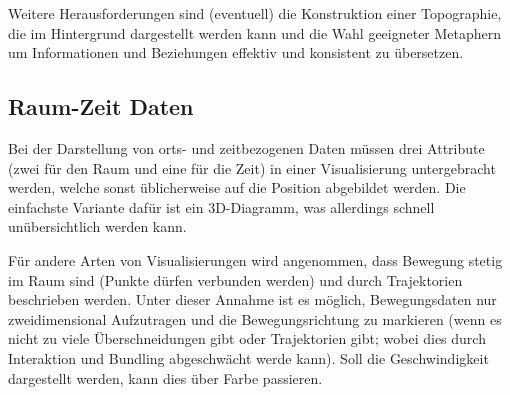 			Weitere Herausforderungen sind (eventuell) die Konstruktion einer Topographie, die im Hintergrund dargestellt werden kann und die Wahl geeigneter Metaphern um Informationen und Beziehungen effektiv und konsistent zu übersetzen.

		\subsection{Raum-Zeit Daten}
			Bei der Darstellung von orts- und zeitbezogenen Daten müssen drei Attribute (zwei für den Raum und eine für die Zeit) in einer Visualisierung untergebracht werden, welche sonst üblicherweise auf die Position abgebildet werden. Die einfachste Variante dafür ist ein 3D-Diagramm, was allerdings schnell unübersichtlich werden kann.

			Für andere Arten von Visualisierungen wird angenommen, dass Bewegung stetig im Raum sind (\dh Punkte dürfen verbunden werden) und durch Trajektorien beschrieben werden. Unter dieser Annahme ist es möglich, Bewegungsdaten nur zweidimensional Aufzutragen und die Bewegungsrichtung zu markieren (wenn es nicht zu viele Überschneidungen gibt oder Trajektorien gibt; wobei dies durch Interaktion und Bundling abgeschwächt werde kann). Soll die Geschwindigkeit dargestellt werden, kann dies \bspw über Farbe passieren.
